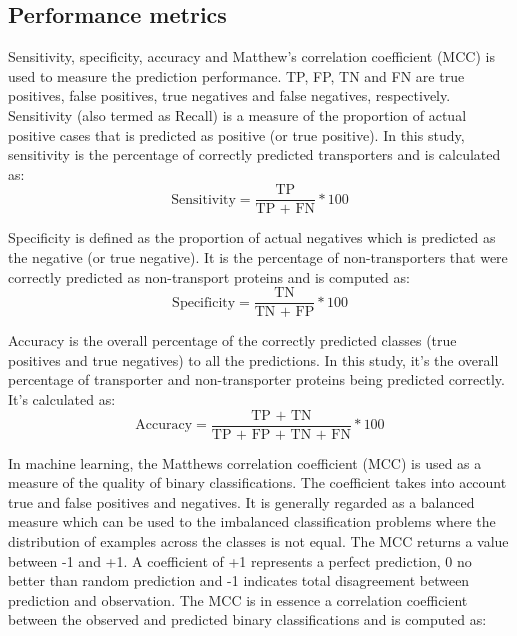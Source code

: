 \subsection{Performance metrics}
\label{subsec:metrics}
    Sensitivity, specificity, accuracy and Matthew's correlation coefficient (MCC) is used to measure the 
    prediction performance. TP, FP, TN and FN are true positives, false positives, 
    true negatives and false negatives, respectively. \\

    Sensitivity (also termed as Recall) is a measure of the proportion of actual positive cases that is 
    predicted as positive (or true positive). In this study, sensitivity is the percentage of correctly predicted transporters 
    and is calculated as:
    \begin{equation}
        \text{Sensitivity} = \frac {\text{TP}}{\text{TP + FN}} * 100
    \end{equation}

    Specificity is defined as the proportion of actual negatives which is predicted as the negative (or true negative). It is  
    the percentage of non-transporters that were correctly predicted as non-transport proteins and is computed as:
    \begin{equation}
        \text{Specificity} = \frac {\text{TN}}{\text{TN + FP}} * 100
    \end{equation}

    Accuracy is the overall percentage of the correctly predicted classes (true positives and true negatives) to all the 
    predictions. In this study, it's the overall percentage of transporter and non-transporter proteins 
    being predicted correctly. It's calculated as:
    \begin{equation}
        \text{Accuracy} = \frac {\text{TP + TN}}{\text{TP + FP + TN + FN}} * 100
    \end{equation}

    In machine learning, the Matthews correlation coefficient (MCC) 
    is used as a measure of the quality of binary classifications. The coefficient takes into account true 
    and false positives and negatives. It is generally regarded as a balanced measure which can be used to 
    the imbalanced classification problems where the distribution of examples across the classes is not equal.\cite{mcc2017optimal}
    The MCC returns a value between -1 and +1. A coefficient of +1 represents a perfect prediction, 0 no better than 
    random prediction and -1 indicates total disagreement between prediction and observation. The MCC is in 
    essence a correlation coefficient between the observed and predicted binary classifications and is computed as:
    
